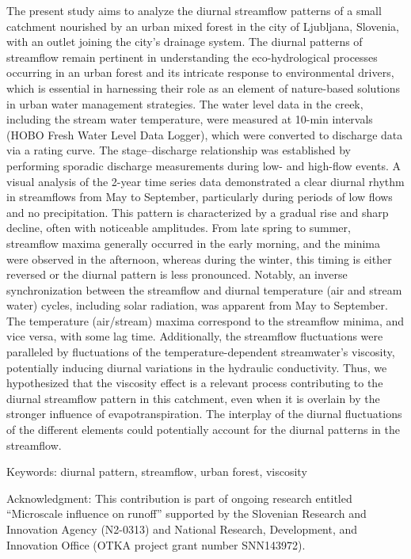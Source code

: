 The present study aims to analyze the diurnal streamflow patterns of a small catchment nourished by an urban mixed forest in the city of Ljubljana, Slovenia, with an outlet joining the city’s drainage system. The diurnal patterns of streamflow remain pertinent in understanding the eco-hydrological processes occurring in an urban forest and its intricate response to environmental drivers, which is essential in harnessing their role as an element of nature-based solutions in urban water management strategies. The water level data in the creek, including the stream water temperature, were measured at 10-min intervals (HOBO Fresh Water Level Data Logger), which were converted to discharge data via a rating curve. The stage–discharge relationship was established by performing sporadic discharge measurements during low- and high-flow events. A visual analysis of the 2-year time series data demonstrated a clear diurnal rhythm in streamflows from May to September, particularly during periods of low flows and no precipitation. This pattern is characterized by a gradual rise and sharp decline, often with noticeable amplitudes. From late spring to summer, streamflow maxima generally occurred in the early morning, and the minima were observed in the afternoon, whereas during the winter, this timing is either reversed or the diurnal pattern is less pronounced. Notably, an inverse synchronization between the streamflow and diurnal temperature (air and stream water) cycles, including solar radiation, was apparent from May to September. The temperature (air/stream) maxima correspond to the streamflow minima, and vice versa, with some lag time. Additionally, the streamflow fluctuations were paralleled by fluctuations of the temperature-dependent streamwater’s viscosity, potentially inducing diurnal variations in the hydraulic conductivity. Thus, we hypothesized that the viscosity effect is a relevant process contributing to the diurnal streamflow pattern in this catchment, even when it is overlain by the stronger influence of evapotranspiration. The interplay of the diurnal fluctuations of the different elements could potentially account for the diurnal patterns in the streamflow.

Keywords: diurnal pattern, streamflow, urban forest, viscosity

Acknowledgment: This contribution is part of ongoing research entitled “Microscale influence on runoff” supported by the Slovenian Research and Innovation Agency (N2-0313) and National Research, Development, and Innovation Office (OTKA project grant number SNN143972).

